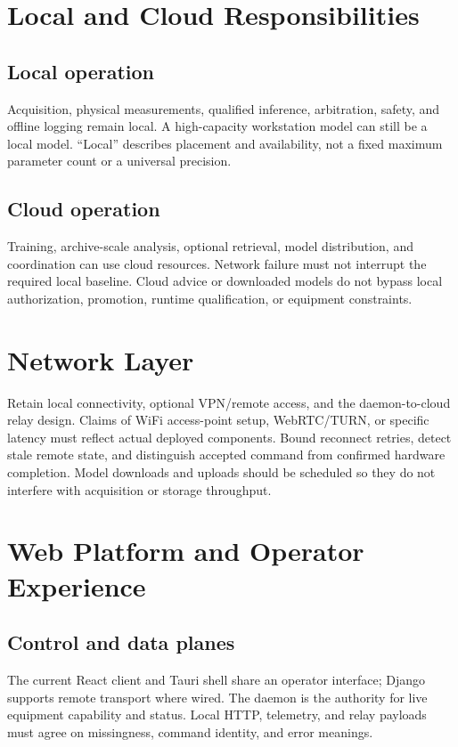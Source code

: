 \documentclass[11pt,a4paper]{article}
\begin{document}
\section{Local and Cloud Responsibilities}
\subsection{Local operation}
Acquisition, physical measurements, qualified inference, arbitration, safety,
and offline logging remain local. A high-capacity workstation model can still
be a local model. ``Local'' describes placement and availability, not a fixed
maximum parameter count or a universal precision.

\subsection{Cloud operation}
Training, archive-scale analysis, optional retrieval, model distribution, and
coordination can use cloud resources. Network failure must not interrupt the
required local baseline. Cloud advice or downloaded models do not bypass local
authorization, promotion, runtime qualification, or equipment constraints.

\section{Network Layer}
Retain local connectivity, optional VPN/remote access, and the daemon-to-cloud
relay design. Claims of WiFi access-point setup, WebRTC/TURN, or specific
latency must reflect actual deployed components. Bound reconnect retries,
detect stale remote state, and distinguish accepted command from confirmed
hardware completion. Model downloads and uploads should be scheduled so they
do not interfere with acquisition or storage throughput.

\section{Web Platform and Operator Experience}
\subsection{Control and data planes}
The current React client and Tauri shell share an operator interface; Django
supports remote transport where wired. The daemon is the authority for live
equipment capability and status. Local HTTP, telemetry, and relay payloads must
agree on missingness, command identity, and error meanings.
\end{document}
